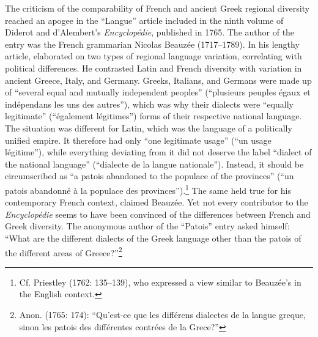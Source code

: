 \documentclass[output=paper]{langsci/langscibook}
\begin{document}
The criticism of the comparability of French and ancient Greek regional diversity reached an apogee in the “Langue” article included in the ninth volume of Diderot and d’Alembert’s \textit{Encyclopédie}, published in 1765. The author of the entry was the French grammarian Nicolas Beauzée (1717–1789). In his lengthy article, \citet[249]{Beauzée1765} elaborated on two types of regional language variation, correlating with political differences. He contrasted Latin and French diversity with variation in ancient Greece, Italy, and Germany. Greeks, Italians, and Germans were made up of “several equal and mutually independent peoples” (“plusieurs peuples égaux et indépendans les uns des autres”), which was why their dialects were “equally legitimate” (“également légitimes”) forms of their respective national language. The situation was different for Latin, which was the language of a politically unified empire. It therefore had only “one legitimate usage” (“un usage légitime”), while everything deviating from it did not deserve the label “dialect of the national language” (“dialecte de la langue nationale”). Instead, it should be circumscribed as “a patois abandoned to the populace of the provinces” (“un patois abandonné à la populace des provinces”).\footnote{Cf. Priestley (1762: 135–139), who expressed a view similar to Beauzée’s in the English context.} The same held true for his contemporary French context, claimed Beauzée. Yet not every contributor to the \textit{Encyclopédie} seems to have been convinced of the differences between French and Greek diversity. The anonymous author of the “Patois” entry asked himself: “What are the different dialects of the Greek language other than the patois of the different areas of Greece?”\footnote{Anon. (1765: 174): “Qu’est-ce que les différens dialectes de la langue greque, sinon les patois des différentes contrées de la Grece?”}
\end{document}
